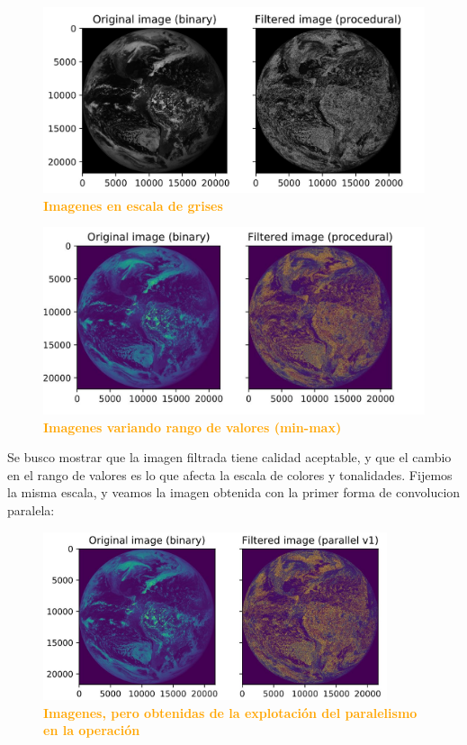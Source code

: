 \documentclass{article}
\begin{document}
    \begin{figure}[H]
    \centering
      \includegraphics[width=1.0\textwidth]{figures/procedural_grey.jpg}
       \centering
       \caption{\textbf{\textcolor{Orange}{Imagenes en escala de grises}}}
    \end{figure}

    \begin{figure}[H]
    \centering
      \includegraphics[width=1.0\textwidth]{figures/procedural_change_sat.jpg}
       \centering
       \caption{\textbf{\textcolor{Orange}{Imagenes variando rango de valores (min-max)}}}
    \end{figure}
    
    Se busco mostrar que la imagen filtrada tiene calidad aceptable, y que el cambio en el rango de valores es lo que afecta la escala de colores y tonalidades. Fijemos la misma escala, y veamos la imagen obtenida con la primer forma de convolucion paralela:\\
        
    \begin{figure}[H]
    \centering
      \includegraphics[width=0.9\textwidth]{figures/parallel1_1.jpg}
       \centering
       \caption{\textbf{\textcolor{Orange}{Imagenes, pero obtenidas de la explotación del paralelismo en la operación}}}
    \end{figure}
    
\end{document}
